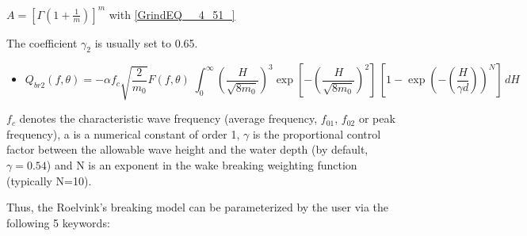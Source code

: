 $A=\left[\Gamma \left(1+\frac{1}{m} \right)\right]^{m} $ with  \eqref{GrindEQ__4_51_}

The coefficient $\gamma _{2} $ is usually set to 0.65.

\begin{itemize}
\item  {}
\begin{equation} \label{GrindEQ__4_52_}
Q_{br2} \left(f,\theta \right)=-\alpha f_{c} \sqrt{\frac{2}{m_{0} } } F\left(f,\theta \right)\; \int _{0}^{\infty }\left(\frac{H}{\sqrt{8m_{0} } } \right)^{3} \exp \left[-\left(\frac{H}{\sqrt{8m_{0} } } \right)^{2} \right]\, \left[1-\exp \left(-\left(\frac{H}{\gamma d} \right)\right)^{N} \right]\,  dH
\end{equation}
\end{itemize}
$f_{c} $ denotes the characteristic wave frequency (average frequency, $f_{01} $, $f_{02} $ or peak frequency), a is a numerical constant of order 1, $\gamma $ is the proportional control factor between the allowable wave height and the water depth (by default, $\gamma =0.54$) and N is an exponent in the wake breaking weighting function (typically N=10).

 Thus, the Roelvink's breaking model can be parameterized by the user via the following 5 keywords:

